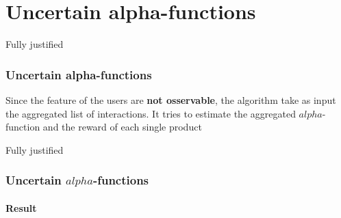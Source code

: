 \documentclass{beamer}
\begin{document}

\section{Uncertain alpha-functions}

\begin {frame}{Fully justified}

\frametitle{Uncertain alpha-functions}
Since the feature of the users are \textbf{not osservable}, the algorithm take as input the aggregated list of interactions.
It tries to estimate the aggregated $alpha$-function and the reward of each single product

\end{frame}


\begin {frame}{Fully justified}

\frametitle{Uncertain $alpha$-functions}
\framesubtitle{Result}

\end{frame}








\end{document}
